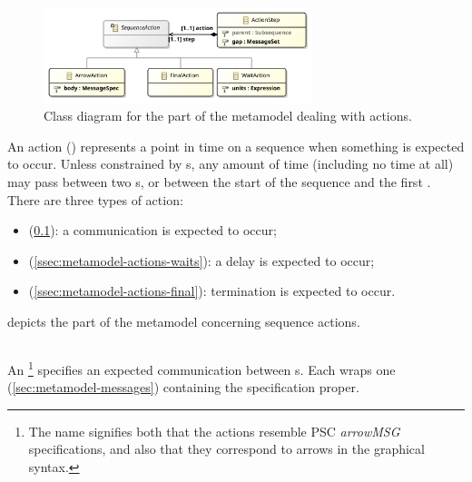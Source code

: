 \begin{figure}[htb]
	\centering
	\includegraphics[width=0.7\textwidth]{diagrams/Actions}
	\caption{Class diagram for the part of the \langname{} metamodel dealing with actions.}
	\label{fig:metamodel-actions}
\end{figure}

An action (\msequenceaction{}) represents a point in time on a
sequence when something is expected to occur.  Unless constrained by
\mdeadlinestep s, any amount of time (including no time at all) may
pass between two \msequenceaction s, or between the start of the
sequence and the first \msequenceaction.  There are three types of
action:
\begin{itemize}
\item \marrowaction{} (\cref{ssec:metamodel-actions-arrows}):
  a communication is expected to occur;
\item \mwaitaction{} (\cref{ssec:metamodel-actions-waits}):
  a delay is expected to occur;
\item \mfinalaction{} (\cref{ssec:metamodel-actions-final}):
  termination is expected to occur.
\end{itemize}

 depicts the part of the metamodel concerning
sequence actions.

\subsection{\marrowaction}\label{ssec:metamodel-actions-arrows}

An \marrowaction\footnote{The name signifies both that the actions resemble
PSC \emph{arrowMSG} specifications, and also that they correspond to arrows in
the graphical syntax.} specifies an expected communication between \mactor s.
Each \marrowaction{} wraps one
\mmessagespec{} (\cref{sec:metamodel-messages})
containing the specification proper.

